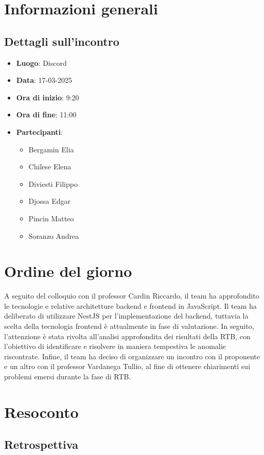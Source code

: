 \section{Informazioni generali}
\subsection{Dettagli sull'incontro}
\begin{itemize}
    \item \textbf{Luogo}: Discord
    \item \textbf{Data}: 17-03-2025
    \item \textbf{Ora di inizio}: 9:20
    \item \textbf{Ora di fine}: 11:00
    \item \textbf{Partecipanti}:
    \begin{itemize}
        \item Bergamin Elia
        \item Chilese Elena
        \item Diviesti Filippo
        \item Djossa Edgar
        \item Pincin Matteo 
        \item Soranzo Andrea  
    \end{itemize}
\end{itemize}

\section{Ordine del giorno}
A seguito del colloquio con il professor Cardin Riccardo, il team ha approfondito le tecnologie e relative architetture backend e frontend in JavaScript.
Il team ha deliberato di utilizzare NestJS per l'implementazione del backend, tuttavia la scelta della tecnologia frontend è attualmente in fase di valutazione.
In seguito, l'attenzione è stata rivolta all'analisi approfondita dei risultati della RTB, con l'obiettivo di identificare e risolvere in maniera tempestiva le anomalie riscontrate.
Infine, il team ha deciso di organizzare un incontro con il proponente e un altro con il professor Vardanega Tullio, al fine di ottenere chiarimenti sui problemi emersi durante la fase di RTB.
\section{Resoconto}
\subsection{Retrospettiva}
